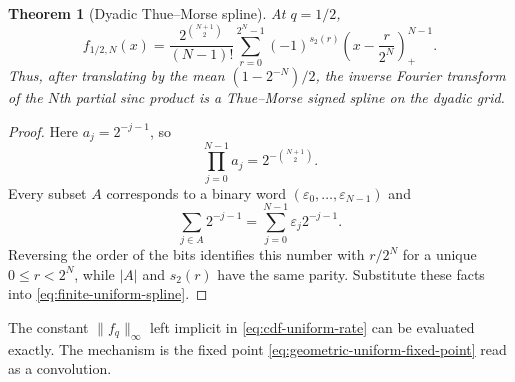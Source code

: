 \documentclass[11pt,oneside,openany]{book}
\newtheorem{theorem}{Theorem}[chapter]
\theoremstyle{definition}
\theoremstyle{remark}
\newcommand{\abs}[1]{\lvert #1\rvert}
\newcommand{\norm}[1]{\lVert #1\rVert}
\begin{document}
\begin{theorem}[Dyadic Thue--Morse spline]\label{thm:dyadic-thue-morse-spline}
At $q=1/2$,
\begin{equation}\label{eq:dyadic-thue-morse-spline}
 f_{1/2,N}(x)
 =\frac{2^{\binom{N+1}{2}}}{(N-1)!}
 \sum_{r=0}^{2^N-1}(-1)^{s_2(r)}
 \left(x-\frac r{2^N}\right)_+^{N-1}.
\end{equation}
Thus, after translating by the mean $(1-2^{-N})/2$, the inverse Fourier transform of the $N$th partial sinc product is a Thue--Morse signed spline on the dyadic grid.
\end{theorem}

\begin{proof}
Here $a_j=2^{-j-1}$, so
\[
 \prod_{j=0}^{N-1}a_j=2^{-\binom{N+1}{2}}.
\]
Every subset $A$ corresponds to a binary word $(\varepsilon_0,\ldots,\varepsilon_{N-1})$ and
\[
 \sum_{j\in A}2^{-j-1}
 =\sum_{j=0}^{N-1}\varepsilon_j2^{-j-1}.
\]
Reversing the order of the bits identifies this number with $r/2^N$ for a unique
$0\le r<2^N$, while $\abs A$ and $s_2(r)$ have the same parity.  Substitute these facts into \eqref{eq:finite-uniform-spline}.
\end{proof}


The constant $\norm{f_q}_\infty$ left implicit in \eqref{eq:cdf-uniform-rate} can be
evaluated exactly.  The mechanism is the fixed point
\eqref{eq:geometric-uniform-fixed-point} read as a convolution.
\end{document}
